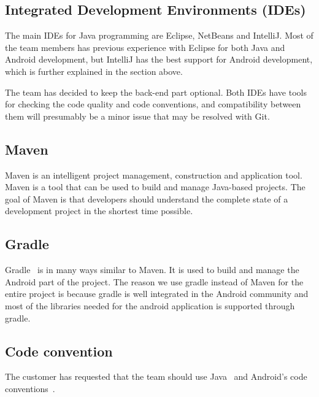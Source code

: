 \subsection{Integrated Development Environments (IDEs)}
The main IDEs for Java programming are Eclipse, NetBeans and IntelliJ. Most of the team members has previous experience with Eclipse for both Java and Android development, but IntelliJ has the best support for Android development, which is further explained in the section above.

The team has decided to keep the back-end part optional. Both IDEs have tools for checking the code quality and code conventions, and compatibility between them will presumably be a minor issue that may be resolved with Git.

\subsection{Maven}
Maven is an intelligent project management, construction and application tool. Maven is a tool that can be used to build and manage Java-based projects. The goal of Maven is that developers should understand the complete state of a development project in the shortest time possible.

\subsection{Gradle}
Gradle~\cite{gradle} is in many ways similar to Maven. It is used to build and manage the Android part of the project. The reason we use gradle instead of Maven for the entire project is because gradle is well integrated in the Android community and most of the libraries needed for the android application is supported through gradle.

\subsection{Code convention}
The customer has requested that the team should use Java~\cite{javaconv} and Android's code conventions~\cite{androidconv}.

